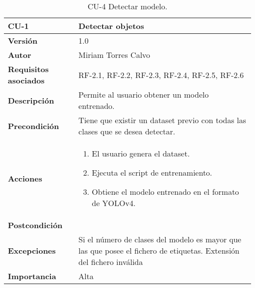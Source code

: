 \begin{table}[p]
  \centering
  \begin{tabularx}{\linewidth}{ p{} p{} }
  \toprule
  \textbf{CU-1} & \textbf{Detectar objetos}\\
  \toprule
  \textbf{Versión} & 1.0\\
  \textbf{Autor} & Miriam Torres Calvo\\
  \textbf{Requisitos asociados} & RF-2.1, RF-2.2, RF-2.3, RF-2.4, RF-2.5, RF-2.6\\
  \textbf{Descripción} & Permite al usuario obtener un modelo entrenado.\\
  \textbf{Precondición} & Tiene que existir un dataset previo con todas las clases que se desea detectar.\\
  \textbf{Acciones} &
  \begin{enumerate}
  \def\labelenumi{\arabic{enumi}.}
  \tightlist
  \item El usuario genera el dataset.
  \item Ejecuta el script de entrenamiento.
  \item Obtiene el modelo entrenado en el formato de YOLOv4.
  \end{enumerate}\\
  \textbf{Postcondición} & \\
  \textbf{Excepciones} & Si el número de clases del modelo es mayor que las que posee el fichero de etiquetas. Extensión del fichero inválida\\
  \textbf{Importancia} & Alta \\
  \bottomrule
  \end{tabularx}
  \caption{CU-4 Detectar modelo.}
\end{table}